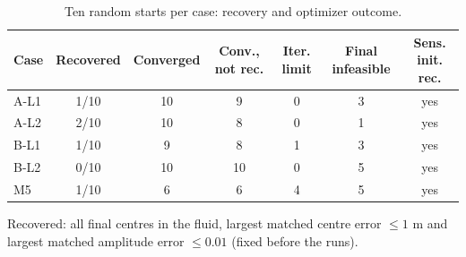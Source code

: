 \begin{table}[htbp]
\centering
\caption{Ten random starts per case: recovery and optimizer outcome.}
\label{tab:table_recovery}
\footnotesize
\begin{tabular}{lcccccc}
\toprule
Case & Recovered & Converged & Conv., not rec. & Iter. limit & Final infeasible & Sens. init. rec. \\
\midrule
A-L1 & 1/10 & 10 & 9 & 0 & 3 & yes \\
A-L2 & 2/10 & 10 & 8 & 0 & 1 & yes \\
B-L1 & 1/10 & 9 & 8 & 1 & 3 & yes \\
B-L2 & 0/10 & 10 & 10 & 0 & 5 & yes \\
M5 & 1/10 & 6 & 6 & 4 & 5 & yes \\
\bottomrule
\end{tabular}
\par\smallskip
\parbox{0.92\linewidth}{\scriptsize Recovered: all final centres in the fluid, largest matched centre error $\le 1$ m and largest matched amplitude error $\le 0.01$ (fixed before the runs).}
\end{table}

